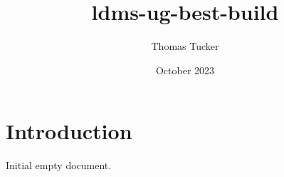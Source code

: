 \documentclass{article}
\title{ldms-ug-best-build}
\author{Thomas Tucker}
\date{October 2023}
\begin{document}
\section{Introduction}
Initial empty document.
\end{document}
